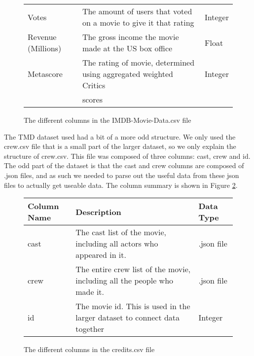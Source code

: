 \begin{figure}[h]
\begin{tabular}[width = \textwidth]{lll}
                Votes   &               The amount of users that voted on a movie to give it that rating            & Integer \\ 
                Revenue (Millions) &    The gross income the movie made at the US box office                        & Float \\  
                Metascore   &           The rating of movie, determined using aggregated weighted Critics           & Integer \\
                {}          &           scores                                                                      & {} \\         
                \bottomrule
            \end{tabular}
            \caption[short]{The different columns in the IMDB-Movie-Data.csv file}\label{fig-IMDB-Movie-Data-Column-Description}
        \end{figure}
        \newline
        The TMD dataset used had a bit of a more odd structure.
        We only used the crew.csv file that is a small part of the larger dataset, so we only explain the structure of crew.csv.
        This file was composed of three columns: cast, crew and id.
        The odd part of the dataset is that the cast and crew columns are composed of .json files, and as such we needed to parse 
            out the useful data from these json files to actually get useable data.
        The column summary is shown in Figure \ref*{fig-Credits-Column-Description}.
        \begin{figure}[h]
            \centering
            \begin{tabular}[width = \textwidth]{lll}
                \toprule
                Column Name &           Description                                                                 & Data Type  \\
                \midrule
                cast &                  The cast list of the movie, including all actors who appeared in it.        & .json file \\          
                crew &                  The entire crew list of the movie, including all the people who made it.    & .json file \\
                id &                    The movie id. This is used in the larger dataset to connect data together   & Integer     \\        
                \bottomrule
            \end{tabular}
            \caption[short]{The different columns in the credits.csv file}\label{fig-Credits-Column-Description}
        \end{figure}

